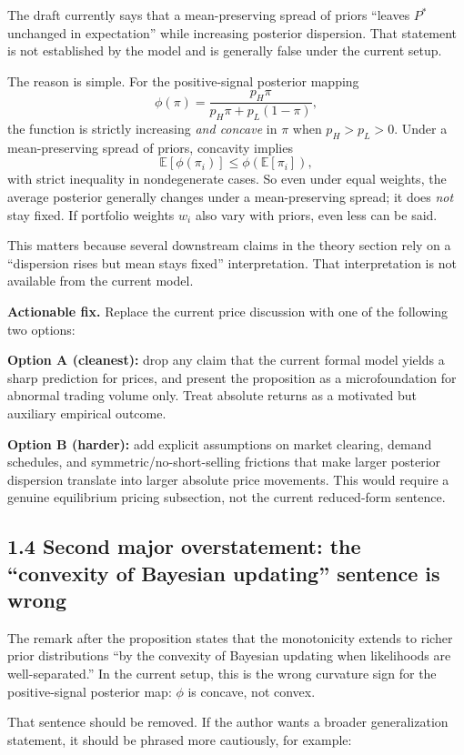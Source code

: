 \documentclass[11pt]{article}
\begin{document}
The draft currently says that a mean-preserving spread of priors ``leaves $P^*$ unchanged in expectation'' while increasing posterior dispersion. That statement is not established by the model and is generally false under the current setup.

The reason is simple. For the positive-signal posterior mapping
\[
\phi(\pi)=\frac{p_H\pi}{p_H\pi+p_L(1-\pi)},
\]
the function is strictly increasing \emph{and concave} in $\pi$ when $p_H>p_L>0$. Under a mean-preserving spread of priors, concavity implies
\[
\mathbb{E}[\phi(\pi_i)] \le \phi(\mathbb{E}[\pi_i]),
\]
with strict inequality in nondegenerate cases. So even under equal weights, the average posterior generally changes under a mean-preserving spread; it does \emph{not} stay fixed. If portfolio weights $w_i$ also vary with priors, even less can be said.

This matters because several downstream claims in the theory section rely on a ``dispersion rises but mean stays fixed'' interpretation. That interpretation is not available from the current model.

\textbf{Actionable fix.} Replace the current price discussion with one of the following two options:

\textbf{Option A (cleanest):} drop any claim that the current formal model yields a sharp prediction for prices, and present the proposition as a microfoundation for abnormal trading volume only. Treat absolute returns as a motivated but auxiliary empirical outcome.

\textbf{Option B (harder):} add explicit assumptions on market clearing, demand schedules, and symmetric/no-short-selling frictions that make larger posterior dispersion translate into larger absolute price movements. This would require a genuine equilibrium pricing subsection, not the current reduced-form sentence.

\subsection*{1.4 Second major overstatement: the ``convexity of Bayesian updating'' sentence is wrong}

The remark after the proposition states that the monotonicity extends to richer prior distributions ``by the convexity of Bayesian updating when likelihoods are well-separated.'' In the current setup, this is the wrong curvature sign for the positive-signal posterior map: $\phi$ is concave, not convex.

That sentence should be removed. If the author wants a broader generalization statement, it should be phrased more cautiously, for example:
\end{document}
